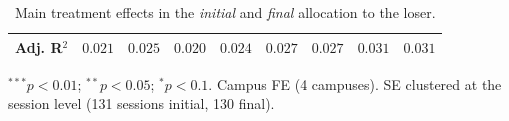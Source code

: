 \begin{table}[htpb]
\begin{center}
\begin{footnotesize}
\begin{threeparttable}
\begin{tabular}{l c c c c c c c c}
Adj. R$^2$                              & $0.021$        & $0.025$        & $0.020$        & $0.024$        & $0.027$        & $0.027$        & $0.031$        & $0.031$        \\
\bottomrule
\end{tabular}
\begin{tablenotes}[flushleft]
\footnotesize{\item $^{***}p<0.01$; $^{**}p<0.05$; $^{*}p<0.1$. Campus FE (4 campuses). SE clustered at the session level (131 sessions initial, 130 final).}
\end{tablenotes}
\end{threeparttable}
\end{footnotesize}
\caption{Main treatment effects in the \textit{initial} and \textit{final} allocation to the loser.}
\label{regtreatmentBeforeAfter}
\end{center}
\end{table}

